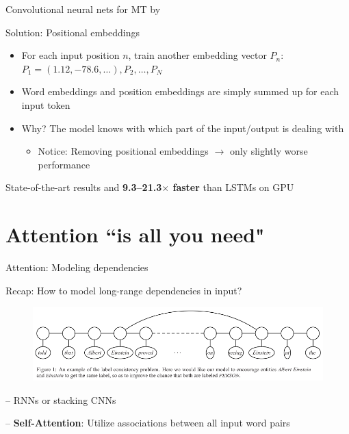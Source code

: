 \documentclass[12pt,aspectratio=169,handout]{beamer}
\begin{document}
\begin{frame}{Convolutional neural nets for MT by \citet{Gehring.et.al.2017a.ICML}}
	
	Solution: Positional embeddings
	
	\begin{itemize}
		\item For each input position $n$, train another embedding vector $P_n$: $P_1 = (1.12, -78.6, \dots), P_2, \dots, P_N$
		
		\item Word embeddings and position embeddings are simply summed up for each input token
		
		\item Why? The model knows with which part of the input/output is dealing with
		
		\begin{itemize}
			\item Notice: Removing positional embeddings $\to$ only slightly worse performance
		\end{itemize}
		
		
	\end{itemize}
	
	
	State-of-the-art results and \textbf{9.3--21.3$\times$ faster} than LSTMs on GPU
	
\end{frame}

\section{Attention ``is all you need"}

\begin{frame}{Attention: Modeling dependencies}
	
	Recap: How to model long-range dependencies in input?
	
	\begin{figure}
		\includegraphics[width=0.95\linewidth]{img/long-deps.png}
	\end{figure}
	
	
	-- RNNs or stacking CNNs
	
	-- \textbf{Self-Attention}: Utilize associations between all input word pairs
	
	
\end{frame}
\end{document}
